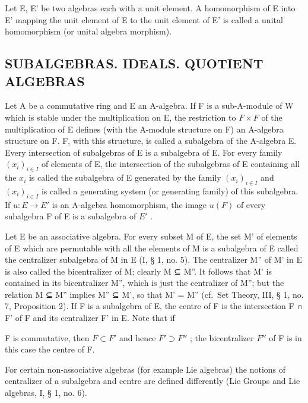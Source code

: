 Let E, E' be two algebras each with a unit element. A homomorphism of E into E' mapping the unit element of E to the unit element of E' is called a unital homomorphism (or unital algebra morphism).

\subsection{SUBALGEBRAS. IDEALS. QUOTIENT ALGEBRAS}

Let A be a commutative ring and E an A-algebra. If F is a sub-A-module of W which is stable under the multiplication on E, the restriction to \(F \times F\) of the multiplication of E defines (with the A-module structure on F) an A-algebra structure on F. F, with this structure, is called a subalgebra of the A-algebra E. Every intersection of subalgebras of E is a subalgebra of E. For every family \((x_{i})_{i \in I}\) of elements of E, the intersection of the subalgebras of E containing all the \(x_{i}\) is called the subalgebra of E generated by the family \((x_{i})_{i \in I}\) and \((x_{i})_{i \in I}\) is called a generating system (or generating family) of this subalgebra. If \(u: E \to E'\) is an A-algebra homomorphism, the image \(u(F)\) of every subalgebra F of E is a subalgebra of \(E'\) .

Let E be an associative algebra. For every subset M of E, the set M' of elements of E which are permutable with all the elements of M is a subalgebra of E called the centralizer subalgebra of M in E (I, § 1, no. 5). The centralizer M'' of M' in E is also called the bicentralizer of M; clearly M ⊆ M''. It follows that M' is contained in its bicentralizer M'', which is just the centralizer of M''; but the relation M ⊆ M'' implies M'' ⊆ M', so that M' = M'' (cf.~Set Theory, III, § 1, no. 7, Proposition 2). If F is a subalgebra of E, the centre of F is the intersection F ∩ F' of F and its centralizer F' in E. Note that if

F is commutative, then \(F \subset F'\) and hence \(F' \supset F''\) ; the bicentralizer \(F''\) of F is in this case the centre of F.

For certain non-associative algebras (for example Lie algebras) the notions of centralizer of a subalgebra and centre are defined differently (Lie Groups and Lie algebras, I, § 1, no. 6).


